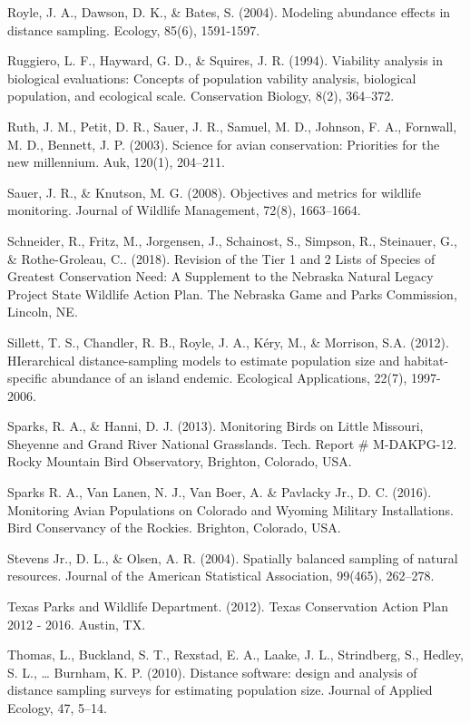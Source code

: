 \documentclass[
  letterpaper,
  DIV=11,
  numbers=noendperiod,
  oneside]{scrreprt}
\begin{document}
Royle, J. A., Dawson, D. K., \& Bates, S. (2004). Modeling abundance
effects in distance sampling. Ecology, 85(6), 1591-1597.

Ruggiero, L. F., Hayward, G. D., \& Squires, J. R. (1994). Viability
analysis in biological evaluations: Concepts of population vability
analysis, biological population, and ecological scale. Conservation
Biology, 8(2), 364--372.

Ruth, J. M., Petit, D. R., Sauer, J. R., Samuel, M. D., Johnson, F. A.,
Fornwall, M. D., Bennett, J. P. (2003). Science for avian conservation:
Priorities for the new millennium. Auk, 120(1), 204--211.

Sauer, J. R., \& Knutson, M. G. (2008). Objectives and metrics for
wildlife monitoring. Journal of Wildlife Management, 72(8), 1663--1664.

Schneider, R., Fritz, M., Jorgensen, J., Schainost, S., Simpson, R.,
Steinauer, G., \& Rothe-Groleau, C.. (2018). Revision of the Tier 1 and
2 Lists of Species of Greatest Conservation Need: A Supplement to the
Nebraska Natural Legacy Project State Wildlife Action Plan. The Nebraska
Game and Parks Commission, Lincoln, NE.

Sillett, T. S., Chandler, R. B., Royle, J. A., Kéry, M., \& Morrison,
S.A. (2012). HIerarchical distance-sampling models to estimate
population size and habitat-specific abundance of an island endemic.
Ecological Applications, 22(7), 1997-2006.

Sparks, R. A., \& Hanni, D. J. (2013). Monitoring Birds on Little
Missouri, Sheyenne and Grand River National Grasslands. Tech. Report \#
M-DAKPG-12. Rocky Mountain Bird Observatory, Brighton, Colorado, USA.

Sparks R. A., Van Lanen, N. J., Van Boer, A. \& Pavlacky Jr., D. C.
(2016). Monitoring Avian Populations on Colorado and Wyoming Military
Installations. Bird Conservancy of the Rockies. Brighton, Colorado, USA.

Stevens Jr., D. L., \& Olsen, A. R. (2004). Spatially balanced sampling
of natural resources. Journal of the American Statistical Association,
99(465), 262--278.

Texas Parks and Wildlife Department. (2012). Texas Conservation Action
Plan 2012 - 2016. Austin, TX.

Thomas, L., Buckland, S. T., Rexstad, E. A., Laake, J. L., Strindberg,
S., Hedley, S. L., \ldots{} Burnham, K. P. (2010). Distance software:
design and analysis of distance sampling surveys for estimating
population size. Journal of Applied Ecology, 47, 5--14.
\end{document}
